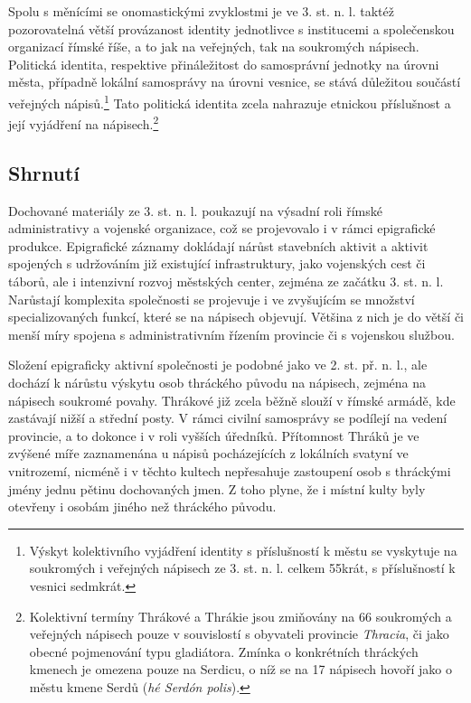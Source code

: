 Spolu s měnícími se onomastickými zvyklostmi je ve 3. st. n. l. taktéž pozorovatelná větší provázanost identity jednotlivce s institucemi a společenskou organizací římské říše, a to jak na veřejných, tak na soukromých nápisech. Politická identita, respektive přináležitost do samosprávní jednotky na úrovni města, případně lokální samosprávy na úrovni vesnice, se stává důležitou součástí veřejných nápisů.\footnote{Výskyt kolektivního vyjádření identity s příslušností k městu se vyskytuje na soukromých i veřejných nápisech ze 3. st. n. l. celkem 55krát, s příslušností k vesnici sedmkrát.} Tato politická identita zcela nahrazuje etnickou příslušnost a její vyjádření na nápisech.\footnote{Kolektivní termíny Thrákové a Thrákie jsou zmiňovány na 66 soukromých a veřejných nápisech pouze v souvislostí s obyvateli provincie {\em Thracia}, či jako obecné pojmenování typu gladiátora. Zmínka o konkrétních thráckých kmenech je omezena pouze na Serdicu, o níž se na 17 nápisech hovoří jako o městu kmene Serdů ({\em hé Serdón polis}).}

\subsection[shrnutí-19]{Shrnutí}

Dochované materiály ze 3. st. n. l. poukazují na výsadní roli římské administrativy a vojenské organizace, což se projevovalo i v rámci epigrafické produkce. Epigrafické záznamy dokládají nárůst stavebních aktivit a aktivit spojených s udržováním již existující infrastruktury, jako vojenských cest či táborů, ale i intenzivní rozvoj městských center, zejména ze začátku 3. st. n. l. Narůstají komplexita společnosti se projevuje i ve zvyšujícím se množství specializovaných funkcí, které se na nápisech objevují. Většina z nich je do větší či menší míry spojena s administrativním řízením provincie či s vojenskou službou.

Složení epigraficky aktivní společnosti je podobné jako ve 2. st. př. n. l., ale dochází k nárůstu výskytu osob thráckého původu na nápisech, zejména na nápisech soukromé povahy. Thrákové již zcela běžně slouží v římské armádě, kde zastávají nižší a střední posty. V rámci civilní samosprávy se podílejí na vedení provincie, a to dokonce i v roli vyšších úředníků. Přítomnost Thráků je ve zvýšené míře zaznamenána u nápisů pocházejících z lokálních svatyní ve vnitrozemí, nicméně i v těchto kultech nepřesahuje zastoupení osob s thráckými jmény jednu pětinu dochovaných jmen. Z toho plyne, že i místní kulty byly otevřeny i osobám jiného než thráckého původu.

